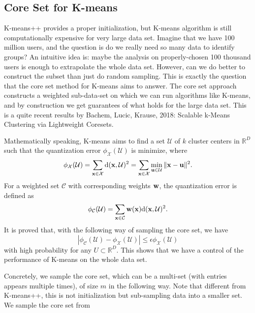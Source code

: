 \documentclass[../book-template.tex]{subfiles}
\begin{document}
\subsection{Core Set for K-means}
K-means++ provides a proper initialization, but K-means algorithm is still computationally expensive for very large data set. Imagine that we have 100 million users, and the question is do we really need so many data to identify groups? An intuitive idea is: maybe the analysis on properly-chosen 100 thousand users is enough to extrapolate the whole data set. However, can we do better to construct the subset than just do random sampling. This is exactly the question that the core set method for K-means aims to answer. The core set approach constructs a weighted sub-data-set on which we can run algorithms like K-means, and by construction we get guarantees of what holds for the large data set. This is a quite recent results by Bachem, Lucic, Krause, 2018: Scalable k-Means Clustering via Lightweight Coresets.
\par Mathematically speaking, K-means aims to find a set $\mathcal{U}$ of $k$ cluster centers in $\mathbb{R}^D$ such that the quantization error $\phi_{\mathcal{X}}(\mathcal{U})$ is minimize, where
\begin{equation}\label{eq_6_qe}
	\phi_{\mathcal{X}}(\mathcal{U}) = \sum_{{\bf x}\in \mathcal{X}}{\rm d}({\bf x}, \mathcal{U})^2=\sum_{{\bf x} \in \mathcal{X}}\min_{{\bf u}\in \mathcal{U}} \|{\bf x-u}\|^2.
\end{equation}
For a weighted set $\mathcal{C}$ with corresponding weights ${\bf w}$, the quantization error is defined as
\begin{equation*}
	\phi_{\mathcal{C}}(\mathcal{U}) = \sum_{{\bf x}\in \mathcal{C}}{\bf w}({\bf x}){\rm d}({\bf x},\mathcal{U})^2.
\end{equation*}
It is proved that, with the following way of sampling the core set, we have
\begin{equation}\label{eq_6_epsi_gua}
	|\phi_{\mathcal{C}}(\mathcal{U}) - \phi_{\mathcal{X}}(\mathcal{U})|\leq \epsilon \phi_{\mathcal{X}}(\mathcal{U})
\end{equation}
with high probability for any $U \subset \mathbb{R}^D$. This shows that we have a control of the performance of K-means on the whole data set.
\par Concretely, we sample the core set, which can be a multi-set (with entries appears multiple times), of size $m$ in the following way. Note that different from K-means++, this is not initialization but sub-sampling data into a smaller set. We sample the core set from
\end{document}
